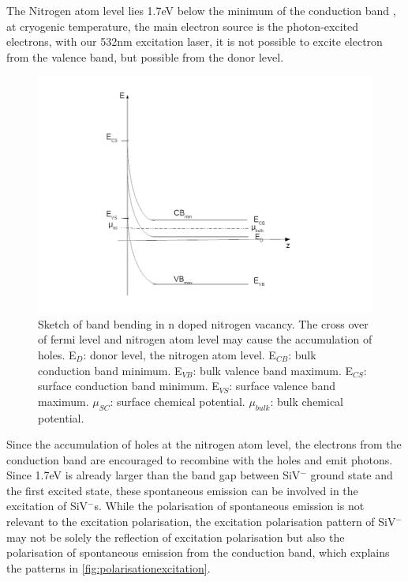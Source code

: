 The Nitrogen atom level lies 1.7eV below the minimum of the conduction band \citep{diederich_electron_1998}, at cryogenic temperature, the main electron source is the photon-excited electrons, with our 532nm excitation laser, it is not possible to excite electron from the valence band, but possible from the donor level.

\begin{figure}[h]
\centering
\includegraphics[width=1\linewidth]{Figures/pic/nbandbend}
\caption{Sketch of band bending in n doped nitrogen vacancy. The cross over of fermi level and nitrogen atom level may cause the accumulation of holes. E$_{D}$: donor level, the nitrogen atom level. E$_{CB}$: bulk conduction band minimum. E$_{VB}$: bulk valence band maximum. E$_{CS}$: surface conduction band minimum. E$_{VS}$: surface valence band maximum. $\mu_{SC}$: surface chemical potential. $\mu_{bulk}$: bulk chemical potential.} 
\label{fig:nbandbend}
\end{figure}
 

Since the accumulation of holes at the nitrogen atom level, the electrons from the conduction band are encouraged to recombine with the holes and emit photons. Since 1.7eV is already larger than the band gap between SiV$^{-}$ ground state and the first excited state, these spontaneous emission can be involved in the excitation of SiV$^{-}$s. 
While the polarisation of spontaneous emission is not relevant to the excitation polarisation, the excitation polarisation pattern of SiV$^{-}$ may not be solely the reflection of excitation polarisation but also the polarisation of spontaneous emission from the conduction band, which explains the patterns in \ref{fig:polarisationexcitation}.

